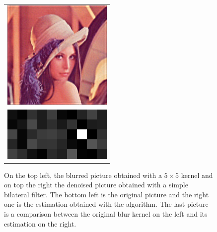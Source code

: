 \documentclass{article}
\begin{document}
\begin{figure}
\begin{center}
\begin{tabular}{c}
		\includegraphics[scale=1]{images/estimation_5px.png}\\
		\includegraphics[scale=1]{images/kernels_5px.png}
	\end{tabular}
	\caption{On the top left, the blurred picture obtained with a $5\times5$ kernel and on top the right the denoised picture obtained with a simple bilateral filter. The bottom left is the original picture and the right one is the estimation obtained with the algorithm. The last picture is a comparison between the original blur kernel on the left and its estimation on the right.}
	\label{lena_5px}
\end{center}
\end{figure}
\end{document}
